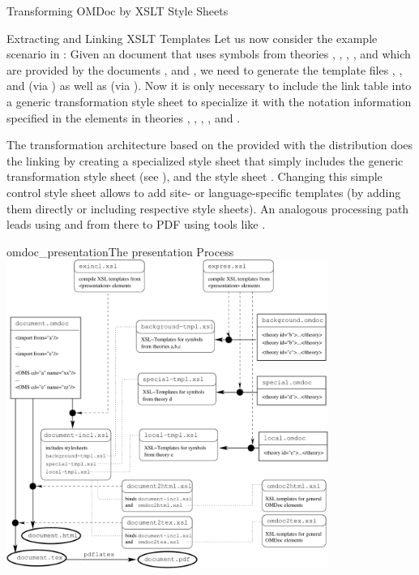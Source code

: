 \begin{tchapter}[id=transform-xsl,short=Transforming OMDoc]{Transforming OMDoc by XSLT Style Sheets}
\begin{tsection}[id=extract-link-xslt]{Extracting and Linking XSLT Templates}
Let us now consider the example scenario in {}: Given an
{\omdoc} document {} that uses symbols from theories
{}, {}, {}, {}, and {} which are
provided by the {\omdoc} documents {},
{} and {}, we need to
generate the template files {},
{}, and {} (via
{}) as well as {} (via
{}).  Now it is only necessary to include the link table
{} into a generic transformation style sheet to
specialize it with the notation information specified in the {}
elements in theories {}, {}, {}, {}, and
{}.

The transformation architecture based on the {} provided with the
{\omdoc} distribution does the linking by creating a specialized style sheet
{} that simply includes the generic {\omdoc}
transformation style sheet {} (see {}), and
the style sheet {}. Changing this simple control
style sheet allows to add site- or language-specific templates (by adding them directly or
including respective style sheets).  An analogous processing path leads
{} using {} and from there to PDF
using tools like {}.

\begin{myfig}{omdoc_presentation}{The {\omdoc} presentation Process}
  \includegraphics[width=10.5cm]{figures/presentation-arch}
\end{myfig}


\end{tsection}
\end{tchapter}
